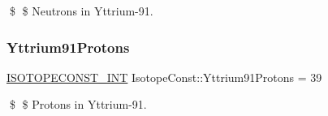\$ \$ Neutrons in Yttrium-\/91. \mbox{\label{group___isotope_const-_yttrium-_y91_gaf641ca9f4bbe88832d02cfc9371e1aa2}} 
\subsubsection{\texorpdfstring{Yttrium91\+Protons}{Yttrium91Protons}}
{\footnotesize\ttfamily \mbox{\hyperlink{group___isotope_const-_macros_ga5f18360b3e99483a35c32d789e62621c}{I\+S\+O\+T\+O\+P\+E\+C\+O\+N\+S\+T\+\_\+\+I\+NT}} Isotope\+Const\+::\+Yttrium91\+Protons = 39}

\$ \$ Protons in Yttrium-\/91. 